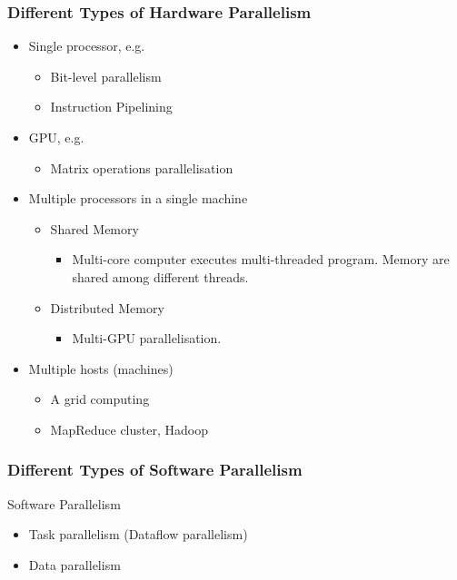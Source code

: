 \documentclass{beamer}
\begin{document}
\begin{frame}[fragile]
\frametitle{Different Types of Hardware Parallelism}

\begin{itemize}
\item Single processor, e.g. 
\begin{itemize}
 \item Bit-level parallelism
 \item Instruction Pipelining
\end{itemize}
\item GPU, e.g. 
   \begin{itemize}
      \item Matrix operations parallelisation
   \end{itemize}
\item Multiple processors in a single machine
 \begin{itemize}
 \item Shared Memory
    \begin{itemize}
       \item Multi-core computer executes multi-threaded
         program. Memory are shared among different threads. 
    \end{itemize}
 \item Distributed Memory
    \begin{itemize}
      \item Multi-GPU parallelisation.
    \end{itemize}
 \end{itemize}
\item Multiple hosts (machines)
   \begin{itemize}
       \item A grid computing
       \item MapReduce cluster, Hadoop
   \end{itemize}
\end{itemize}
\end{frame}




\begin{frame}[fragile]
\frametitle{Different Types of Software Parallelism}

Software Parallelism
\begin{itemize}
 \item Task parallelism (Dataflow parallelism)
 \item Data parallelism

\end{itemize}

\end{frame}
\end{document}
